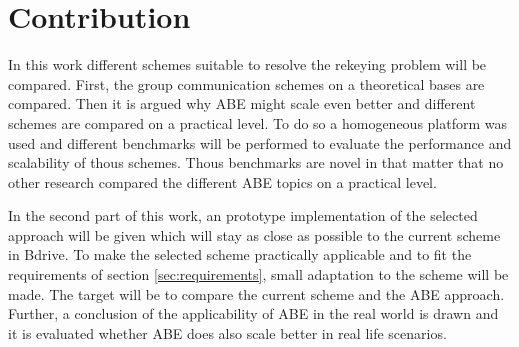 \section{Contribution}
In this work different schemes suitable to resolve the rekeying problem will be compared. First, the group communication schemes on a theoretical bases are compared. Then it is argued why ABE might scale even better and different schemes are compared on a practical level. To do so a homogeneous platform was used and different benchmarks will be performed to evaluate the performance and scalability of thous schemes. Thous benchmarks are novel in that matter that no other research compared the different ABE topics on a practical level.  

In the second part of this work, an prototype implementation of the selected approach will be given which will stay as close as possible to the current scheme in Bdrive. To make the selected scheme practically applicable and to fit the requirements of section \ref{sec:requirements}, small adaptation to the scheme will be made. The target will be to compare the current scheme and the ABE approach. Further, a conclusion of the applicability of ABE in the real world is drawn and it is evaluated whether ABE does also scale better in real life scenarios. 